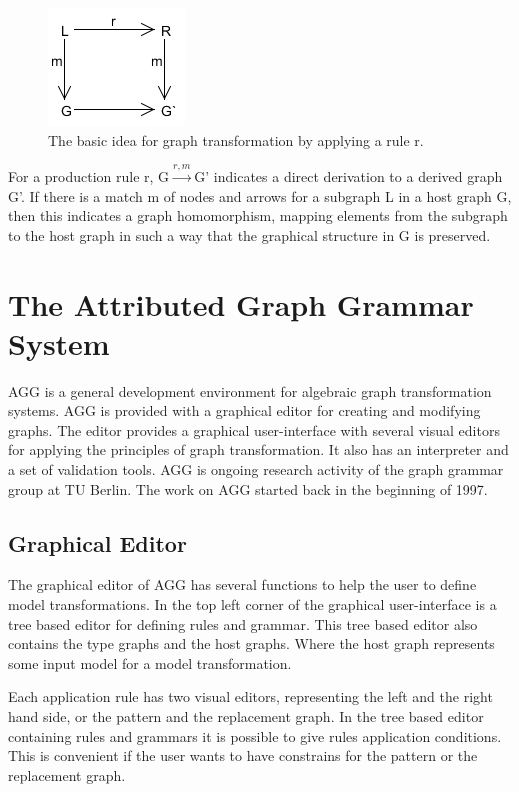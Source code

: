 \documentclass[pdftex,11pt,a4paper]{article}
\begin{document}
\begin{figure}[H]
	\centering
	\includegraphics[scale=0.7]{figures/GraphTransformationGeneral.png}
	\caption{The basic idea for graph transformation by applying a rule r.}
	\label{fig:GraphTransformationGeneral}
\end{figure}

For a production rule r, \mbox{G$\xrightarrow{r,m}$G'} indicates a direct
derivation to a derived graph G'. If there is a match m of nodes and arrows for a
subgraph L in a host graph G, then this indicates a graph homomorphism, mapping
elements from the subgraph to the host graph in such a way that the graphical
structure in G is preserved.

\section{The Attributed Graph Grammar System}

\noindent AGG is a general development environment for algebraic graph
transformation systems. AGG is provided with a graphical editor for creating
and modifying graphs. The editor provides a graphical user-interface with
several visual editors for applying the principles of graph transformation. It
also has an interpreter and a set of validation tools. AGG is ongoing research
activity of the graph grammar group at TU Berlin. The work on AGG started back
in the beginning of 1997.

\subsection{Graphical Editor}
\noindent The graphical editor of AGG has several functions to help the user to
define model transformations. In the top left corner of the graphical user-interface is
a tree based editor for defining rules and grammar. This tree based editor also
contains the type graphs and the host graphs. Where the host graph represents
some input model for a model transformation.

\indent Each application rule has two visual editors, representing the left and
the right hand side, or the pattern and the replacement graph. In the tree
based editor containing rules and grammars it is possible to give rules application
conditions. This is convenient if the user wants to have constrains for the
pattern or the replacement graph.
\end{document}

